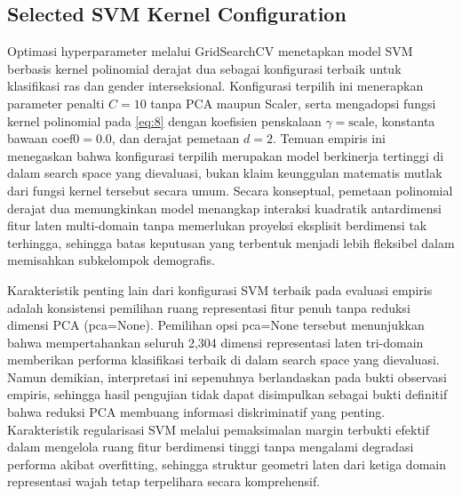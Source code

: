 \subsection{Selected SVM Kernel Configuration}
\label{sec:svm_kernel_analysis}

Optimasi hyperparameter melalui GridSearchCV menetapkan model SVM berbasis kernel polinomial derajat dua sebagai konfigurasi terbaik untuk klasifikasi ras dan gender interseksional. Konfigurasi terpilih ini menerapkan parameter penalti $C=10$ tanpa PCA maupun Scaler, serta mengadopsi fungsi kernel polinomial pada \eqref{eq:8} dengan koefisien penskalaan $\gamma=\text{scale}$, konstanta bawaan $\text{coef0}=0.0$, dan derajat pemetaan $d=2$. Temuan empiris ini menegaskan bahwa konfigurasi terpilih merupakan model berkinerja tertinggi di dalam search space yang dievaluasi, bukan klaim keunggulan matematis mutlak dari fungsi kernel tersebut secara umum. Secara konseptual, pemetaan polinomial derajat dua memungkinkan model menangkap interaksi kuadratik antardimensi fitur laten multi-domain tanpa memerlukan proyeksi eksplisit berdimensi tak terhingga, sehingga batas keputusan yang terbentuk menjadi lebih fleksibel dalam memisahkan subkelompok demografis.

Karakteristik penting lain dari konfigurasi SVM terbaik pada evaluasi empiris adalah konsistensi pemilihan ruang representasi fitur penuh tanpa reduksi dimensi PCA (pca=None). Pemilihan opsi pca=None tersebut menunjukkan bahwa mempertahankan seluruh 2,304 dimensi representasi laten tri-domain memberikan performa klasifikasi terbaik di dalam search space yang dievaluasi. Namun demikian, interpretasi ini sepenuhnya berlandaskan pada bukti observasi empiris, sehingga hasil pengujian tidak dapat disimpulkan sebagai bukti definitif bahwa reduksi PCA membuang informasi diskriminatif yang penting. Karakteristik regularisasi SVM melalui pemaksimalan margin terbukti efektif dalam mengelola ruang fitur berdimensi tinggi tanpa mengalami degradasi performa akibat overfitting, sehingga struktur geometri laten dari ketiga domain representasi wajah tetap terpelihara secara komprehensif.
